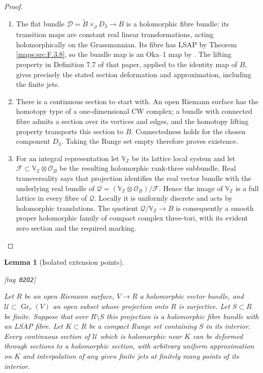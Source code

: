 \documentclass[11pt,a4paper]{article}
\numberwithin{equation}{section}
\newtheorem{lemma}[lemma]{Lemma}
\theoremstyle{definition}
\newcommand{\StatementRecord}[4]{{\upshape\footnotesize[tag~\texttt{#3}]}\enspace\ignorespaces}
\begin{document}
\begin{proof}
\begin{enumerate}[label=\arabic*.]
\item The flat bundle
$\mathscr D=\widetilde B\times_\rho D_3\to B$ is a holomorphic
fibre bundle: its transition maps are constant real linear
transformations, acting holomorphically on the Grassmannian.
Its fibre has LSAP by Theorem \ref{maps:src:F.3.8}, so the bundle map is an
Oka--1 map by \cite[Proposition 7.13(d), p.~24]{IVVOkaOneV5}.
The lifting property in Definition 7.7 of that paper, applied
to the identity map of $B$, gives precisely the stated section
deformation and approximation, including the finite jets.


\item There is a continuous section to start with.  An open Riemann
surface has the homotopy type of a one-dimensional CW complex;
a bundle with connected fibre admits a section over its vertices
and edges, and the homotopy lifting property transports this
section to $B$.  Connectedness holds for the chosen component
$D_3$.  Taking the Runge set empty therefore proves existence.

\item For an integral representation let $\mathbb V_\mathbb Z$ be its
lattice local system and let $\mathcal F\subset
\mathbb V_\mathbb Z\otimes\mathcal O_B$ be the resulting
holomorphic rank-three subbundle.  Real transversality says that
projection identifies the real vector bundle with the underlying
real bundle of
$\mathcal Q=(\mathbb V_\mathbb Z\otimes\mathcal O_B)/\mathcal F$.
Hence the image of $\mathbb V_\mathbb Z$ is a full lattice in
every fibre of $\mathcal Q$.  Locally it is uniformly discrete
and acts by holomorphic translations.  The quotient
$\mathcal Q/\mathbb V_\mathbb Z\to B$ is consequently a smooth
proper holomorphic family of compact complex three-tori,
with its evident zero section and the required marking.

\end{enumerate}
\end{proof}




\begin{lemma}[Isolated extension points]\hypertarget{tag-02O2}{}\label{maps:src:F.3.10}
\StatementRecord{maps:src:F.3.10}{proved}{02O2}{\eqref{maps:eq:F.O5}; \cite[Theorem 1.2, preprint p.~3]{ffForstnericPrezelj02}; \cite[Theorem 2.13, p.~9]{IVVOkaOneV5}}


Let $R$ be an open Riemann surface, $V\to R$ a holomorphic vector
bundle, and $\mathscr U\subset\operatorname{Gr}_r(V)$ an open
subset whose projection onto $R$ is surjective.  Let $S\subset R$
be finite.  Suppose that over $R\setminus S$ this projection is
a holomorphic fibre bundle with an LSAP fibre.  Let $K\subset R$
be a compact Runge set containing $S$ in its interior.
Every continuous section of $\mathscr U$ which is holomorphic
near $K$ can be deformed through sections to a holomorphic
section, with arbitrary uniform approximation on $K$ and
interpolation of any given finite jets at finitely many points
of its interior.

\end{lemma}
\end{document}
